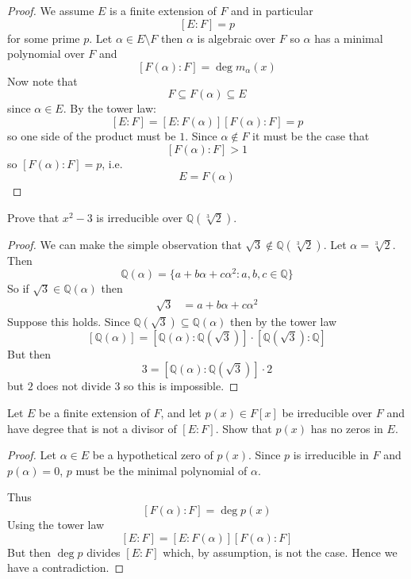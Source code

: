 \begin{proof}
    We assume $E$ is a finite extension of $F$ and in particular 
    \[
        [E:F] = p
    \]
    for some prime $p$. 
    Let $\alpha \in E\setminus F$ then $\alpha$ is algebraic 
    over $F$ so $\alpha$ has a minimal polynomial over 
    $F$ and 
    \[
        [F(\alpha) : F] = \deg m_\alpha(x)
    \]
    Now note that 
    \[
        F \subseteq F(\alpha) \subseteq E
    \]
    since $\alpha \in E$. By the tower law: 
    \[
        [E:F] = [E:F(\alpha)][F(\alpha):F] = p
    \]
    so one side of the product must be $1$. Since $\alpha \not\in F$
    it must be the case that 
    \[
        [F(\alpha) : F] > 1
    \]
    so $[F(\alpha):F] = p$, i.e. 
    \[
        E = F(\alpha)
    \]
\end{proof}
\begin{prob}
    Prove that $x^2 - 3$ is irreducible over 
    $\mathbb Q(\sqrt[3]2)$.
\end{prob}
\begin{proof}
    We can make the simple observation that 
    $\sqrt 3 \not\in \mathbb Q(\sqrt[3]2)$.
    Let $\alpha = \sqrt[3]2$. Then 
    \[
        \mathbb Q(\alpha) = \{a+b\alpha + c\alpha^2 : a,b,c \in 
        \mathbb Q\}
    \]
    So if $\sqrt 3 \in \mathbb Q(\alpha)$ then 
    \begin{align*}
        \sqrt 3 &= a + b\alpha + c\alpha^2
    \end{align*}
    Suppose this holds. Since $\mathbb Q(\sqrt 3) \subseteq 
    \mathbb Q(\alpha)$ then by the tower law 
    \[
        [\mathbb Q(\alpha)] = [\mathbb Q(\alpha) : \mathbb Q(\sqrt 3)]
        \cdot [\mathbb Q(\sqrt 3) : \mathbb Q]
    \]
    But then 
    \[
        3 = [\mathbb Q(\alpha) : \mathbb Q(\sqrt 3)] \cdot 2
    \]
    but $2$ does not divide $3$ so this is impossible.
\end{proof}
\begin{prob}
    Let $E$ be a finite extension of $F$, and let 
    $p(x) \in F[x]$ be irreducible over $F$ and have degree 
    that is not a divisor of $[E:F]$. Show that $p(x)$ has 
    no zeros in $E$.
\end{prob}
\begin{proof}
    Let $\alpha \in E$ be a hypothetical zero of $p(x)$.
    Since $p$ is irreducible in $F$ and $p(\alpha) = 0$, 
    $p$ must be the minimal polynomial of $\alpha$.

    Thus 
    \[
        [F(\alpha) : F] = \deg p(x) 
    \]
    Using the tower law 
    \[
        [E:F] = [E:F(\alpha)] [F(\alpha) : F]
    \]
    But then $\deg p$ divides $[E:F]$ which, by assumption, 
    is not the case. Hence we have a contradiction.
\end{proof}
